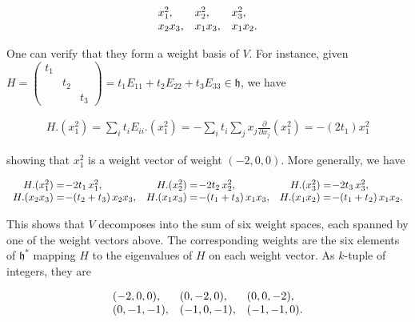 \[\begin{aligned}
\begin{array}[]{lll}x_{1}^{2},&x_{2}^{2},&x_{3}^{2},\\ x_{2}x_{3},&x_{1}x_{3},&x_{1}x_{2}.\end{array}
\end{aligned}\]


One can verify that they form a weight basis of $V$. For instance, given $H=\left(\begin{smallmatrix}t_{1}&&\\ &t_{2}&\\ &&t_{3}\end{smallmatrix}\right)=t_{1}E_{11}+t_{2}E_{22}+t_{3}E_{33}\in\mathfrak{h}$, we have



\[\begin{aligned}
H.(x_{1}^{2})=\textstyle\sum_{i}t_{i}E_{ii}.(x_{1}^{2})=-\sum_{i}t_{i}\sum_{j}x_{j}\displaystyle\frac{\partial}{\partial x_{j}}(x_{1}^{2})=-(2t_{1})x_{1}^{2}
\end{aligned}\]


showing that $x_{1}^{2}$ is a weight vector of weight $(-2,0,0)$. More generally, we have



\[\begin{aligned}
\begin{array}[]{rlrlrl}H.(x_{1}^{2})=\hskip-4.62497pt&\hskip-4.62497pt-2t_{1}\,x_{1}^{2},&H.(x_{2}^{2})=\hskip-4.62497pt&\hskip-4.62497pt-2t_{2}\,x_{2}^{2},&H.(x_{3}^{2})=\hskip-4.62497pt&\hskip-4.62497pt-2t_{3}\,x_{3}^{2},\\ H.(x_{2}x_{3})=\hskip-4.62497pt&\hskip-4.62497pt-(t_{2}+t_{3})\,x_{2}x_{3},&H.(x_{1}x_{3})=\hskip-4.62497pt&\hskip-4.62497pt-(t_{1}+t_{3})\,x_{1}x_{3},&H.(x_{1}x_{2})=\hskip-4.62497pt&\hskip-4.62497pt-(t_{1}+t_{2})\,x_{1}x_{2}.\end{array}
\end{aligned}\]


This shows that $V$ decomposes into the sum of six weight spaces, each spanned by one of the weight vectors above. The corresponding weights are the six elements of $\mathfrak{h}^{*}$ mapping $H$ to the eigenvalues of $H$ on each weight vector. As $k$-tuple of integers, they are



\[\begin{aligned}
\begin{array}[]{lll}(-2,0,0),&(0,-2,0),&(0,0,-2),\\ (0,-1,-1),&(-1,0,-1),&(-1,-1,0).\end{array}
\end{aligned}\]


